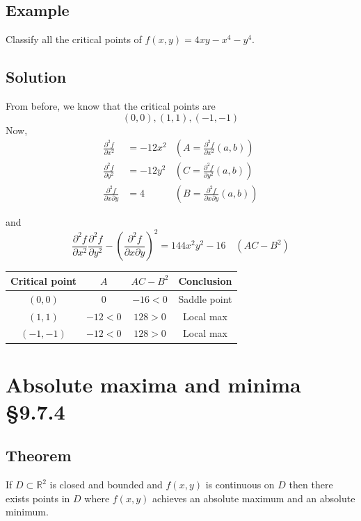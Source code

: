 \documentclass[11pt]{article}
\newcommand{\reals}{\mathbb{R}}
\begin{document}
\subsection{Example}
Classify all the critical points of $f(x, y) = 4xy - x^4 - y^4$.

\subsection{Solution}
From before, we know that the critical points are
\[ (0, 0), (1, 1), (-1, -1) \]
Now,
\begin{align*}
\frac{\partial^2 f}{\partial x^2} &= -12 x^2 &\left( A = \frac{\partial^2 f}{\partial x^2}(a, b) \right) \\
\frac{\partial^2 f}{\partial y^2} &= -12 y^2 &\left( C = \frac{\partial^2 f}{\partial y^2}(a, b) \right) \\
\frac{\partial^2 f}{\partial x \partial y} &= 4 &\left( B = \frac{\partial^2 f}{\partial x \partial y}(a, b) \right)
\end{align*}

and 
\[ \frac{\partial^2 f}{\partial x^2} \frac{\partial^2 f}{\partial y^2} - \left( \frac{\partial^2 f}{\partial x \partial y} \right)^2 = 144x^2y^2 - 16 \quad \left(AC - B^2\right) \]

\begin{tabular}{c|c|c|c}
Critical point & $A$ & $AC - B^2$ & Conclusion \\
\hline
$(0, 0)$ & 0 & $-16 < 0$ & Saddle point\\
$(1, 1)$ & $-12 < 0$ & $128 > 0$ & Local max\\
$(-1, -1)$ & $-12 < 0$ & $128 > 0$ & Local max \\
\end{tabular}

\section{Absolute maxima and minima §9.7.4}
\subsection{Theorem}
If $D \subset \reals^2$ is closed and bounded and $f(x, y)$ is continuous on $D$ then there exists points in $D$ where $f(x, y)$ achieves an absolute maximum and an absolute minimum.
\end{document}
